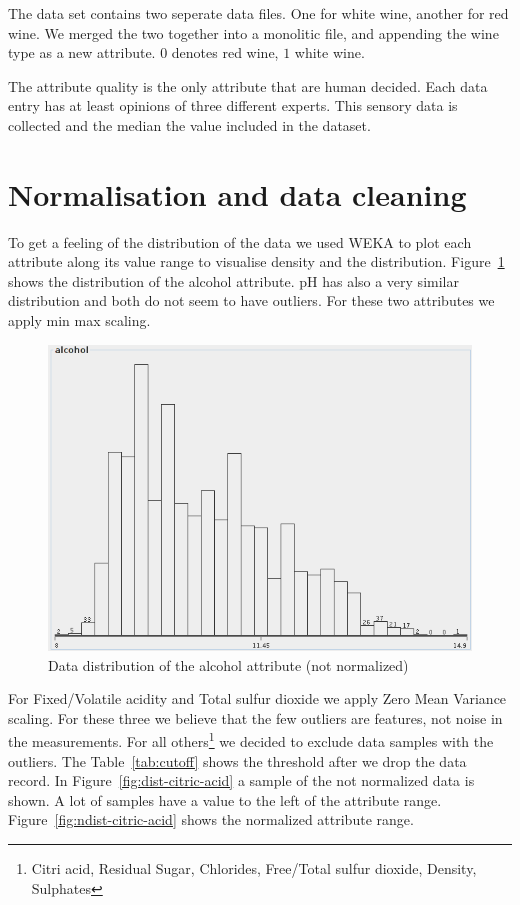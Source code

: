 \documentclass{acm_proc_article-sp}
\begin{document}
The data set contains two seperate data files. One for white wine,
another for red wine. We merged the two together into a monolitic file,
and appending the wine type as a new attribute. $0$ denotes red wine, $1$ white wine.

The attribute quality is the only attribute that are human decided.
Each data entry has at least opinions of three different experts. This
sensory data is collected and the median the value included in the
dataset.

\section{Normalisation and data cleaning}

To get a feeling of the distribution of the data we used
WEKA to plot each attribute along its value range to visualise
density and the distribution.
Figure~\ref{fig:dist-alcohol} shows the distribution of the alcohol attribute. pH has
also a very similar distribution and both do not seem to have outliers.
For these two attributes we apply min max scaling.

\begin{figure}
\centering
\includegraphics[width=0.6\linewidth]{img/dist-alcohol}
\caption{Data distribution of the alcohol attribute (not normalized)}
\label{fig:dist-alcohol}
\end{figure}


For Fixed/Volatile acidity and Total sulfur dioxide we apply Zero Mean Variance scaling. For these three we 
believe that the few outliers are features, not noise in the measurements.
For all others\footnote{Citri acid, Residual Sugar, Chlorides, Free/Total sulfur dioxide, Density, Sulphates}
we decided to exclude data samples with the outliers. The Table~\ref{tab:cutoff} shows the threshold after we drop
the data record. In Figure~\ref{fig:dist-citric-acid} a sample of the not normalized data is shown. A lot
of samples have a value to the left of the attribute range. Figure~\ref{fig:ndist-citric-acid} shows the
normalized attribute range.
\end{document}
